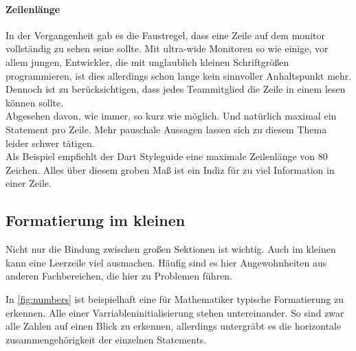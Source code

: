         \paragraph{Zeilenlänge}
            In der Vergangenheit gab es die Faustregel, dass eine Zeile auf dem monitor vollständig zu sehen seine sollte.
            Mit ultra-wide Monitoren so wie einige, vor allem jungen, Entwickler, die mit unglaublich kleinen Schriftgrößen programmieren, ist dies allerdings schon lange kein sinnvoller Anhaltspunkt mehr.
            Dennoch ist zu berücksichtigen, dass jedes Teammitglied die Zeile in einem lesen können sollte.\\
            Abgesehen davon, wie immer, so kurz wie möglich.
            Und natürlich maximal ein Statement pro Zeile.
            Mehr pauschale Aussagen lassen sich zu diesem Thema leider schwer tätigen.\\
            Als Beispiel empfiehlt der Dart Styleguide eine maximale Zeilenlänge von 80 Zeichen.
            Alles über diesem groben Maß ist ein Indiz für zu viel Information in einer Zeile.

    \subsection{Formatierung im kleinen}
        Nicht nur die Bindung zwischen großen Sektionen ist wichtig.
        Auch im kleinen kann eine Leerzeile viel ausmachen.
        Häufig sind es hier Angewohnheiten aus anderen Fachbereichen, die hier zu Problemen führen.
        
        In \ref{fig:numbers} ist beispielhaft eine für Mathematiker typische Formatierung zu erkennen.
        Alle  einer Varriableninitialisierung stehen untereinander.
        So sind zwar alle Zahlen auf einen Blick zu erkennen, allerdings untergräbt es die horizontale zusammengehörigkeit der einzelnen Statements.

